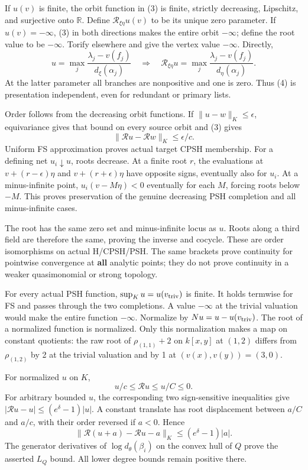 \documentclass[
  11pt,
]{article}
\begin{document}
If \(u(v)\) is finite, the orbit function in (3) is finite, strictly
decreasing, Lipschitz, and surjective onto \(\mathbb R\). Define
\(\mathcal R_{\xi\eta}u(v)\) to be its unique zero parameter. If
\(u(v)=-\infty\), (3) in both directions makes the entire orbit
\(-\infty\); define the root value to be \(-\infty\). Torify elsewhere
and give the vertex value \(-\infty\). Directly,
\[ u=\max_j\frac{\lambda_j-v(f_j)}{d_\xi(\alpha_j)}
 \quad\Longrightarrow\quad
 \mathcal R_{\xi\eta}u=\max_j\frac{\lambda_j-v(f_j)}{d_\eta(\alpha_j)}.       \tag{4}\]
At the latter parameter all branches are nonpositive and one is zero.
Thus (4) is presentation independent, even for redundant or primary
lists.

Order follows from the decreasing orbit functions. If
\(\|u-w\|_K\leq\epsilon\), equivariance gives that bound on every source
orbit and (3) gives
\[ \|\mathcal R u-\mathcal R w\|_K\leq\epsilon/c.                         \tag{5}\]
Uniform FS approximation proves actual target CPSH membership. For a
defining net \(u_i\downarrow u\), roots decrease. At a finite root
\(r\), the evaluations at \(v+(r-\epsilon)\eta\) and
\(v+(r+\epsilon)\eta\) have opposite signs, eventually also for \(u_i\).
At a minus-infinite point, \(u_i(v-M\eta)<0\) eventually for each \(M\),
forcing roots below \(-M\). This proves preservation of the genuine
decreasing PSH completion and all minus-infinite cases.

The root has the same zero set and minus-infinite locus as \(u\). Roots
along a third field are therefore the same, proving the inverse and
cocycle. These are order isomorphisms on actual H/CPSH/PSH. The same
brackets prove continuity for pointwise convergence at \textbf{all}
analytic points; they do not prove continuity in a weaker quasimonomial
or strong topology.

For every actual PSH function, \(\sup_Ku=u(v_{\rm triv})\) is finite. It
holds termwise for FS and passes through the two completions. A value
\(-\infty\) at the trivial valuation would make the entire function
\(-\infty\). Normalize by \(Nu=u-u(v_{\rm triv})\). The root of a
normalized function is normalized. Only this normalization makes a map
on constant quotients: the raw root of \(\rho_{(1,1)}+2\) on \(k[x,y]\)
at \((1,2)\) differs from \(\rho_{(1,2)}\) by 2 at the trivial valuation
and by 1 at \((v(x),v(y))=(3,0)\).

For normalized \(u\) on \(K\),
\[ u/c\leq\mathcal R u\leq u/C\leq0.                                    \tag{6}\]
For arbitrary bounded \(u\), the corresponding two sign-sensitive
inequalities give \(|\mathcal R u-u|\leq(e^\delta-1)|u|\). A constant
translate has root displacement between \(a/C\) and \(a/c\), with their
order reversed if \(a<0\). Hence
\[ \|\mathcal R(u+a)-\mathcal R u-a\|_K\leq(e^\delta-1)|a|.              \tag{7}\]
The generator derivatives of \(\log d_\theta(\beta_i)\) on the convex
hull of \(Q\) prove the asserted \(L_Q\) bound. All lower degree bounds
remain positive there.
\end{document}
